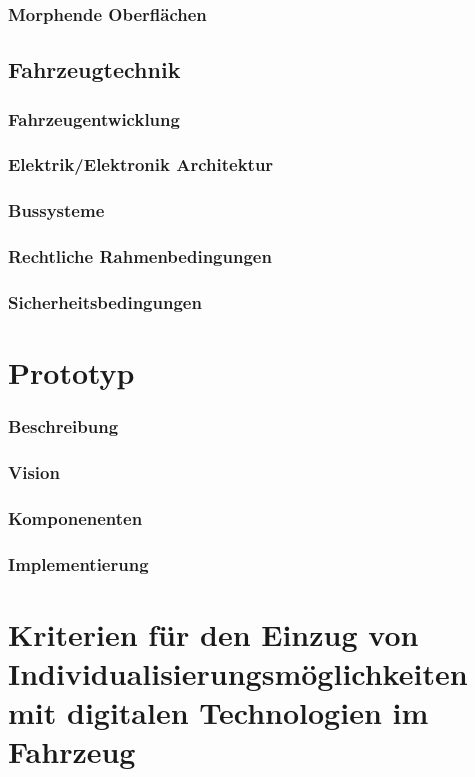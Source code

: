 \subsection{Morphende Oberflächen}
\section{Fahrzeugtechnik}
\subsection{Fahrzeugentwicklung}
\subsection{Elektrik/Elektronik Architektur}
\subsection{Bussysteme}
\subsection{Rechtliche Rahmenbedingungen}
\subsection{Sicherheitsbedingungen}


\chapter{Prototyp}
\label{cha:Prototyp}
\subsection{Beschreibung}
\subsection{Vision}
\subsection{Komponenenten}
\subsection{Implementierung}


\chapter{Kriterien für den Einzug von Individualisierungsmöglichkeiten mit digitalen Technologien im Fahrzeug }
\label{cha:Kriterien}

